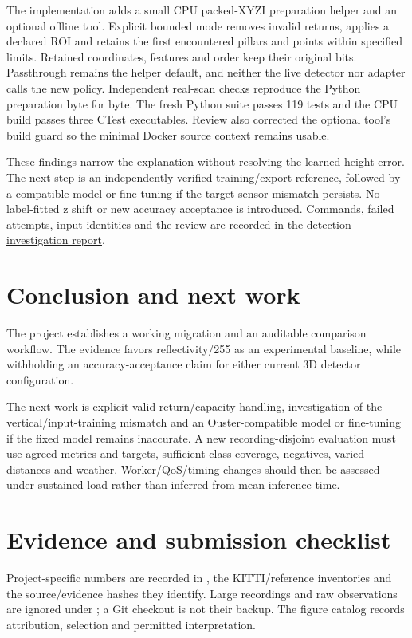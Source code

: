 \documentclass[11pt,a4paper]{article}
\newcommand{\code}[1]{\texttt{\detokenize{#1}}}
\begin{document}
The implementation adds a small CPU packed-XYZI preparation helper and an
optional offline tool. Explicit bounded mode removes invalid returns, applies
a declared ROI and retains the first encountered pillars and points within
specified limits. Retained coordinates, features and order keep their original
bits. Passthrough remains the helper default, and neither the live detector nor
adapter calls the new policy. Independent real-scan checks reproduce the Python
preparation byte for byte. The fresh Python suite passes 119 tests and the CPU
build passes three CTest executables. Review also corrected the optional tool's
build guard so the minimal Docker source context remains usable.

These findings narrow the explanation without resolving the learned height
error. The next step is an independently verified training/export reference,
followed by a compatible model or fine-tuning if the target-sensor mismatch
persists. No label-fitted z shift or new accuracy acceptance is introduced.
Commands, failed attempts, input identities and the review are recorded in
\href{DETECTION\_INVESTIGATION\_AND\_PLAN.md}{the detection investigation report}.

\section{Conclusion and next work}
The project establishes a working migration and an auditable comparison
workflow. The evidence favors reflectivity/255 as an experimental baseline,
while withholding an accuracy-acceptance claim for either current 3D detector
configuration.

The next work is explicit valid-return/capacity handling, investigation of the
vertical/input-training mismatch and an Ouster-compatible model or fine-tuning
if the fixed model remains inaccurate. A new recording-disjoint evaluation must
use agreed metrics and targets, sufficient class coverage, negatives, varied
distances and weather. Worker/QoS/timing changes should then be assessed under
sustained load rather than inferred from mean inference time.

\section*{Evidence and submission checklist}
Project-specific numbers are recorded in
\code{config/ouster_channel_decision.json}, the KITTI/reference inventories and
the source/evidence hashes they identify. Large recordings and raw observations
are ignored under \code{.recovery}; a Git checkout is not their backup. The
figure catalog records attribution, selection and permitted interpretation.
\end{document}
